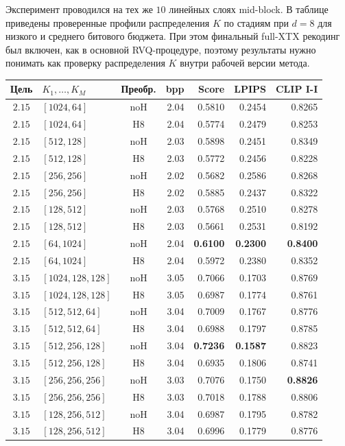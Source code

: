 \documentclass[a4paper,12pt]{article}
\begin{document}
Эксперимент проводился на тех же $10$ линейных слоях mid-block. В таблице приведены проверенные профили распределения $K$ по стадиям при $d=8$ для низкого и среднего битового бюджета. При этом финальный full-XTX рекодинг был включен, как в основной RVQ-процедуре, поэтому результаты нужно понимать как проверку распределения $K$ внутри рабочей версии метода.

\begin{center}
\small
\begin{tabular}{clcrrrr}
\hline
Цель & $K_1,\ldots,K_M$ & Преобр. & bpp & Score & LPIPS & CLIP I-I \\
\hline
$2.15$ & $[1024,64]$ & noH & 2.04 & 0.5810 & 0.2454 & 0.8265 \\
$2.15$ & $[1024,64]$ & H8  & 2.04 & 0.5774 & 0.2479 & 0.8253 \\
$2.15$ & $[512,128]$ & noH & 2.03 & 0.5898 & 0.2451 & 0.8349 \\
$2.15$ & $[512,128]$ & H8  & 2.03 & 0.5772 & 0.2456 & 0.8228 \\
$2.15$ & $[256,256]$ & noH & 2.02 & 0.5682 & 0.2586 & 0.8268 \\
$2.15$ & $[256,256]$ & H8  & 2.02 & 0.5885 & 0.2437 & 0.8322 \\
$2.15$ & $[128,512]$ & noH & 2.03 & 0.5768 & 0.2510 & 0.8278 \\
$2.15$ & $[128,512]$ & H8  & 2.03 & 0.5661 & 0.2531 & 0.8192 \\
$2.15$ & $[64,1024]$ & noH & 2.04 & \textbf{0.6100} & \textbf{0.2300} & \textbf{0.8400} \\
$2.15$ & $[64,1024]$ & H8  & 2.04 & 0.5972 & 0.2380 & 0.8352 \\
\hline
$3.15$ & $[1024,128,128]$ & noH & 3.05 & 0.7066 & 0.1703 & 0.8769 \\
$3.15$ & $[1024,128,128]$ & H8  & 3.05 & 0.6987 & 0.1774 & 0.8761 \\
$3.15$ & $[512,512,64]$ & noH & 3.04 & 0.7009 & 0.1767 & 0.8776 \\
$3.15$ & $[512,512,64]$ & H8  & 3.04 & 0.6988 & 0.1797 & 0.8785 \\
$3.15$ & $[512,256,128]$ & noH & 3.04 & \textbf{0.7236} & \textbf{0.1587} & 0.8823 \\
$3.15$ & $[512,256,128]$ & H8  & 3.04 & 0.6935 & 0.1806 & 0.8741 \\
$3.15$ & $[256,256,256]$ & noH & 3.03 & 0.7076 & 0.1750 & \textbf{0.8826} \\
$3.15$ & $[256,256,256]$ & H8  & 3.03 & 0.7018 & 0.1788 & 0.8806 \\
$3.15$ & $[128,256,512]$ & noH & 3.04 & 0.6987 & 0.1795 & 0.8782 \\
$3.15$ & $[128,256,512]$ & H8  & 3.04 & 0.6996 & 0.1779 & 0.8776 \\
\hline
\end{tabular}
\end{center}
\end{document}
